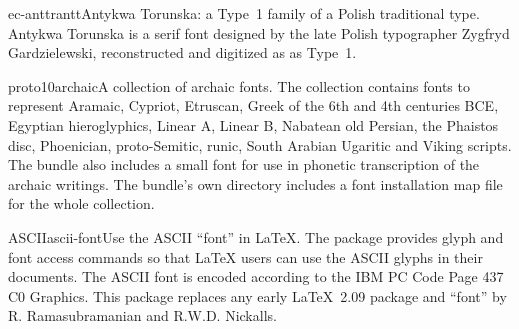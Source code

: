 \documentclass{ddltxtyp}
\begin{document}
\begin{package}{ec-anttr}{antt}{Antykwa Torunska: a Type~1 family of a Polish traditional type.}
Antykwa Torunska is a serif font designed by the late Polish
typographer Zygfryd Gardzielewski, reconstructed and digitized
as as Type~1.
\end{package}

\begin{package}{proto10}{archaic}{A collection of archaic fonts.}
The collection contains fonts to represent Aramaic, Cypriot,
Etruscan, Greek of the 6th and 4th centuries BCE, Egyptian
hieroglyphics, Linear A, Linear B, Nabatean old Persian, the
Phaistos disc, Phoenician, proto-Semitic, runic, South Arabian
Ugaritic and Viking scripts. The bundle also includes a small
font for use in phonetic transcription of the archaic writings.
The bundle's own directory includes a font installation map
file for the whole collection.
\end{package}


\begin{package}{ASCII}{ascii-font}{Use the ASCII ``font'' in {\LaTeX}.}
The package provides glyph and font access commands so that
{\LaTeX} users can use the ASCII glyphs in their documents. The
ASCII font is encoded according to the IBM PC Code Page 437 C0
Graphics. This package replaces any early {\LaTeX}~2.09 package
and ``font'' by R. Ramasubramanian and R.W.D. Nickalls.
\end{package}

\end{document}
